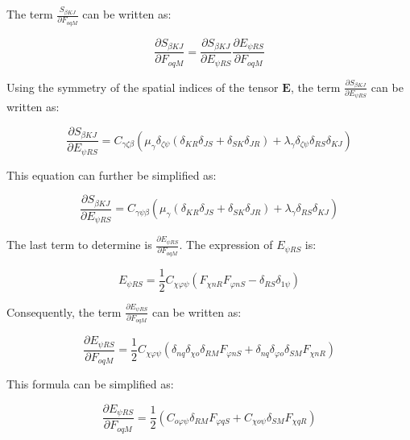 \documentclass[oneside,11pt,times]{book}
\newcommand\omicron{o}
\begin{document}
The term $\frac{S_{ \beta KJ}}{\partial F_{ \omicron qM}}$ can be written as:

\begin{equation}
\frac{\partial S_{ \beta KJ}}{\partial F_{ \omicron qM}} = \frac{\partial S_{ \beta KJ}}{\partial E_{ \psi RS}} \frac{\partial E_{ \psi RS}}{\partial F_{ \omicron qM}}
\end{equation}

Using the symmetry of the spatial indices of the tensor $\bm{E}$, the term $\frac{\partial S_{ \beta KJ}}{\partial E_{ \psi RS}}$ can be written as:

\begin{equation}
\frac{\partial S_{ \beta KJ}}{\partial E_{ \psi RS}} = C_{\gamma \zeta \beta} (\mu_{\gamma}\delta_{\zeta \psi}(\delta_{KR}\delta_{JS} + \delta_{SK}\delta_{JR}) + \lambda_{\gamma}\delta_{\zeta \psi} \delta_{RS}\delta_{KJ})
\end{equation}

This equation can further be simplified as:

\begin{equation}
\frac{\partial S_{ \beta KJ}}{\partial E_{ \psi RS}} = C_{\gamma \psi \beta} (\mu_{\gamma}(\delta_{KR}\delta_{JS} + \delta_{SK}\delta_{JR}) + \lambda_{\gamma} \delta_{RS}\delta_{KJ})
\end{equation}

The last term to determine is $\frac{\partial E_{ \psi RS}}{\partial F_{ \omicron qM}}$. The expression of $E_{ \psi RS}$ is:

\begin{equation}
E_{ \psi RS} = \frac{1}{2}C_{\chi \varphi \psi}(F_{ \chi nR}F_{ \varphi nS} - \delta_{RS}\delta_{1\psi})
\end{equation}

Consequently, the term $\frac{\partial E_{ \psi RS}}{\partial F_{ \omicron qM}}$ can be written as:

\begin{equation}
\frac{\partial E_{ \psi RS}}{\partial F_{ \omicron qM}} = \frac{1}{2}C_{\chi \varphi \psi}(\delta_{nq}\delta_{\chi \omicron}\delta_{RM} F_{ \varphi nS} + \delta_{nq}\delta_{\varphi \omicron}\delta_{SM}F_{ \chi nR})
\end{equation}

This formula can be simplified as:

\begin{equation}
\frac{\partial E_{ \psi RS}}{\partial F_{ \omicron qM}} = \frac{1}{2}(C_{\omicron \varphi \psi}\delta_{RM} F_{ \varphi qS} + C_{\chi \omicron \psi}\delta_{SM}F_{ \chi qR})
\end{equation}
\end{document}
